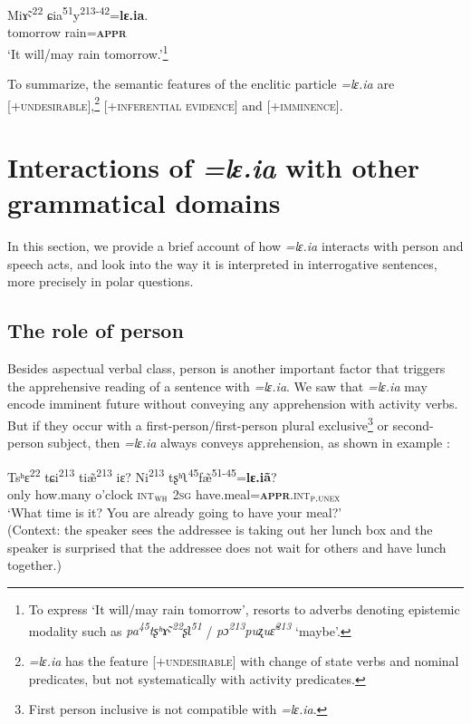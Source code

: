 \documentclass[output=paper,colorlinks,citecolor=brown, language=chinese]{langscibook}
\begin{document}
\ea\label{ex:Song33}
\gll \*Mi\~ɤ˞\textsuperscript{22} ɕia\textsuperscript{51}y\textsuperscript{213-42}=\textbf{lɛ.ia}. \\
tomorrow rain=\textsc{\textbf{appr}}\\
\glt `It will/may rain tomorrow.'\footnote{To express `It will/may rain tomorrow',  resorts to adverbs denoting epistemic modality such as \textit{pa\textsuperscript{45}tʂʰ\~ɤ˞\textsuperscript{22}ʂʅ\textsuperscript{51}} / \textit{pɔ\textsuperscript{213}puʐu\~ɛ\textsuperscript{213}} `maybe'. }
\z

To summarize, the semantic features of the enclitic particle \textit{=lɛ.ia} are [+\textsc{unde\-sir\-able}],\footnote{\textit{=lɛ.ia} has the feature [+\textsc{undesirable}] with change of state verbs and nominal predicates, but not systematically with activity predicates.} [+\textsc{inferential evidence}] and [+\textsc{imminence}].


\section{Interactions of \textit{=lɛ.ia} with other grammatical domains}
\label{sec:leiaperson}

In this section, we provide a brief account of how \textit{=lɛ.ia} interacts with person and speech acts, and look into the way it is interpreted in interrogative sentences, more precisely in polar questions.


\subsection{The role of person}
\label{subsec:person}

Besides aspectual verbal class, person is another important factor that triggers the apprehensive reading of a sentence with \textit{=lɛ.ia}. We saw that \textit{=lɛ.ia} may encode imminent future without conveying any apprehension with activity verbs. But if they occur with a first-person/first-person plural exclusive\footnote{First person inclusive is not compatible with \textit{=lɛ.ia}.} or second-person subject, then \textit{=lɛ.ia} always conveys apprehension, as shown in example :

\ea\label{ex:Song34}
\gll Tsʰɛ\textsuperscript{22} tɕi\textsuperscript{213} ti\~æ\textsuperscript{213} iɛ? Ni\textsuperscript{213} tʂʰʅ\textsuperscript{45}f\~æ\textsuperscript{51-45}=\textbf{lɛ.i\~a}? \\
only how.many o'clock \textsc{int}$_{\textsc{wh}}$ \textsc{2sg} have.meal=\textsc{\textbf{appr}.int}$_{\textsc{p.unex}}$ \\
\glt `What time is it? You are already going to have your meal?' \\
(Context: the speaker sees the addressee is taking out her lunch box and the speaker is 	surprised that the addressee does not wait for others and have lunch together.)
\z
\end{document}

